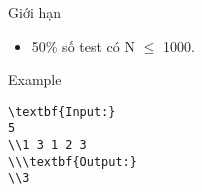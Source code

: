 Giới hạn
\begin{itemize}
	\item     50\% số test có N  $\le$  1000.   
\end{itemize}
Example
\begin{verbatim}
\textbf{Input:}
5
\\1 3 1 2 3
\\\textbf{Output:}
\\3\end{verbatim}